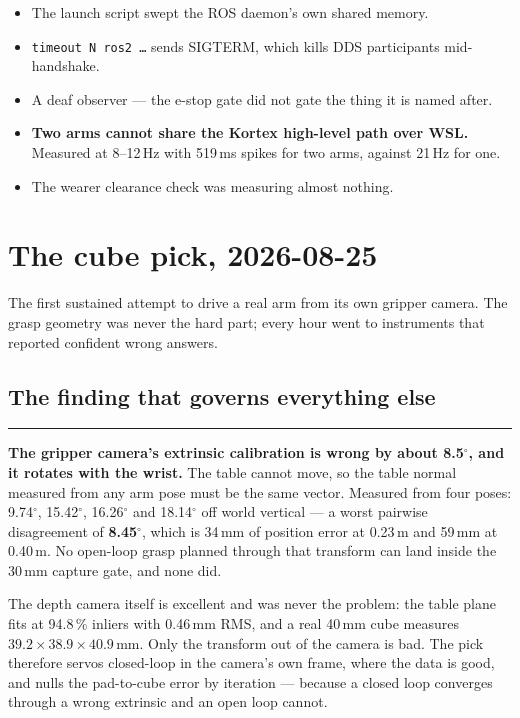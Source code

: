 \documentclass[11pt,a4paper,oneside]{report}
\newcommand{\code}[1]{\texttt{\small #1}}
\newcommand{\dg}{$^{\circ}$}
\newcommand{\keyfact}[1]{%
  \par\vspace{7pt}\noindent
  \hspace*{0pt}\textcolor{srlblue}{\rule{2.5pt}{\dimexpr\baselineskip\relax}}%
  \hspace{9pt}%
  \begin{minipage}[t]{\dimexpr\textwidth-14pt\relax}
  \small #1
  \end{minipage}\par\vspace{7pt}}
\begin{document}
\begin{itemize}
\item The launch script swept the ROS daemon's own shared memory.
\item \code{timeout N ros2 \ldots} sends SIGTERM, which kills DDS participants
      mid-handshake.
\item A deaf observer --- the e-stop gate did not gate the thing it is named
      after.
\item \textbf{Two arms cannot share the Kortex high-level path over WSL.}
      Measured at 8--12\,Hz with 519\,ms spikes for two arms, against 21\,Hz for
      one.
\item The wearer clearance check was measuring almost nothing.
\end{itemize}

\section{The cube pick, 2026-08-25}

The first sustained attempt to drive a real arm from its own gripper camera.
The grasp geometry was never the hard part; every hour went to instruments that
reported confident wrong answers.

\subsection{The finding that governs everything else}

\keyfact{\textbf{The gripper camera's extrinsic calibration is wrong by about
8.5\dg, and it rotates with the wrist.} The table cannot move, so the table
normal measured from any arm pose must be the same vector. Measured from four
poses: 9.74\dg, 15.42\dg, 16.26\dg{} and 18.14\dg{} off world vertical --- a
worst pairwise disagreement of \textbf{8.45\dg}, which is 34\,mm of position
error at 0.23\,m and 59\,mm at 0.40\,m. No open-loop grasp planned through that
transform can land inside the 30\,mm capture gate, and none did.}

The depth camera itself is excellent and was never the problem: the table plane
fits at 94.8\,\% inliers with 0.46\,mm RMS, and a real 40\,mm cube measures
$39.2 \times 38.9 \times 40.9$\,mm. Only the transform out of the camera is
bad. The pick therefore servos closed-loop in the camera's own frame, where the
data is good, and nulls the pad-to-cube error by iteration --- because a closed
loop converges through a wrong extrinsic and an open loop cannot.
\end{document}
